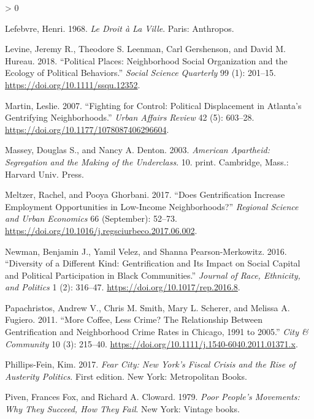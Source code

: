 \documentclass[
  12pt,
]{article}
\newlength{\cslhangindent}
\newenvironment{CSLReferences}[2] %
 {%
  \setlength{\parindent}{0pt}
  \ifodd #1 \everypar{\setlength{\hangindent}{\cslhangindent}}\ignorespaces\fi
  \ifnum #2 > 0
  \setlength{\parskip}{#2\baselineskip}
  \fi
 }%
 {}
\begin{document}
\begin{CSLReferences}{1}{0}
\leavevmode\hypertarget{ref-Lefebvre1968}{}%
Lefebvre, Henri. 1968. \emph{Le {Droit} à La {Ville}}. {Paris}: {Anthropos}.

\leavevmode\hypertarget{ref-Levine2018}{}%
Levine, Jeremy R., Theodore S. Leenman, Carl Gershenson, and David M. Hureau. 2018. {``Political {Places}: {Neighborhood Social Organization} and the {Ecology} of {Political Behaviors}.''} \emph{Social Science Quarterly} 99 (1): 201--15. \url{https://doi.org/10.1111/ssqu.12352}.

\leavevmode\hypertarget{ref-Martin2007a}{}%
Martin, Leslie. 2007. {``Fighting for {Control}: {Political Displacement} in {Atlanta}'s {Gentrifying Neighborhoods}.''} \emph{Urban Affairs Review} 42 (5): 603--28. \url{https://doi.org/10.1177/1078087406296604}.

\leavevmode\hypertarget{ref-Massey2003}{}%
Massey, Douglas S., and Nancy A. Denton. 2003. \emph{American Apartheid: Segregation and the Making of the Underclass}. 10. print. {Cambridge, Mass.}: {Harvard Univ. Press}.

\leavevmode\hypertarget{ref-Meltzer2017}{}%
Meltzer, Rachel, and Pooya Ghorbani. 2017. {``Does Gentrification Increase Employment Opportunities in Low-Income Neighborhoods?''} \emph{Regional Science and Urban Economics} 66 (September): 52--73. \url{https://doi.org/10.1016/j.regsciurbeco.2017.06.002}.

\leavevmode\hypertarget{ref-Newman2016}{}%
Newman, Benjamin J., Yamil Velez, and Shanna Pearson-Merkowitz. 2016. {``Diversity of a {Different Kind}: {Gentrification} and {Its Impact} on {Social Capital} and {Political Participation} in {Black Communities}.''} \emph{Journal of Race, Ethnicity, and Politics} 1 (2): 316--47. \url{https://doi.org/10.1017/rep.2016.8}.

\leavevmode\hypertarget{ref-Papachristos2011}{}%
Papachristos, Andrew V., Chris M. Smith, Mary L. Scherer, and Melissa A. Fugiero. 2011. {``More {Coffee}, {Less Crime}? {The Relationship} Between {Gentrification} and {Neighborhood Crime Rates} in {Chicago}, 1991 to 2005.''} \emph{City \& Community} 10 (3): 215--40. \url{https://doi.org/10.1111/j.1540-6040.2011.01371.x}.

\leavevmode\hypertarget{ref-Phillips-Fein2017}{}%
Phillips-Fein, Kim. 2017. \emph{Fear City: {New York}'s Fiscal Crisis and the Rise of Austerity Politics}. First edition. {New York}: {Metropolitan Books}.

\leavevmode\hypertarget{ref-Piven1979}{}%
Piven, Frances Fox, and Richard A. Cloward. 1979. \emph{Poor People's Movements: Why They Succeed, How They Fail}. {New York}: {Vintage books}.


\end{CSLReferences}
\end{document}
